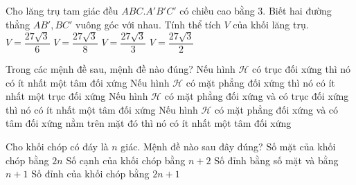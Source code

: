 \begin{ex}%
Cho lăng trụ tam giác đều $ABC.A'B'C'$ có chiều cao bằng 3. Biết hai đường thẳng $AB', BC'$ vuông góc với nhau. Tính thể tích $V$ của khối lăng trụ.
\choice
{$V=\dfrac{27\sqrt{3}}{6}$}
{$V=\dfrac{27\sqrt{3}}{8}$}
{$V=\dfrac{27\sqrt{3}}{3}$}
{\True $V=\dfrac{27\sqrt{3}}{2}$}
\end{ex}

\begin{ex}%
Trong các mệnh đề sau, mệnh đề nào đúng?
\choice
{Nếu hình $\mathcal{H}$ có trục đối xứng thì nó có ít nhất một tâm đối xứng}
{Nếu hình $\mathcal{H}$ có mặt phẳng đối xứng thì nó có ít nhất một trục đối xứng}
{Nếu hình $\mathcal{H}$ có mặt phẳng đối xứng và có trục đối xứng thì nó có ít nhất một tâm đối xứng}
{\True Nếu hình $\mathcal{H}$ có mặt phẳng đối xứng và có tâm đối xứng nằm trên mặt đó thì nó có ít nhất một tâm đối xứng}
\end{ex}

\begin{ex}%
Cho khối chóp có đáy là $n$ giác. Mệnh đề nào sau đây đúng?
\choice
{Số mặt của khối chóp bằng $2n$}
{Số cạnh của khối chóp bằng $n+2$}
{\True Số đỉnh bằng số mặt và bằng $n+1$}
{Số đỉnh của khối chóp bằng $2n+1$}
\end{ex}

